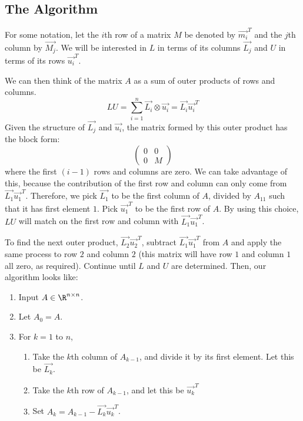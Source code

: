 \documentclass[../Main.tex]{subfiles}
\begin{document}
\subsection{The Algorithm}
For some notation, let the $i$th row of a matrix $M$ be denoted by $\vec{m_i}^T$ and the $j$th column by $\vec{M_j}$. We will be interested in $L$ in terms of its columns $\vec{L_j}$ and $U$ in terms of its rows $\vec{u_i}^T$.

We can then think of the matrix $A$ as a sum of outer products of rows and columns.
\begin{equation*}
    LU = \sum_{i=1}^{n} \vec{L_i} \otimes \vec{u_i} = \vec{L_i} \vec{u_i}^T
\end{equation*}
Given the structure of $\vec{L_j}$ and $\vec{u_i}$, the matrix formed by this outer product has the block form:
\begin{equation*}
    \begin{pmatrix}
        0 & 0 \\
        0 & M
    \end{pmatrix}
\end{equation*}
where the first $(i-1)$ rows and columns are zero. We can take advantage of this, because the contribution of the first row and column can only come from $\vec{L_1} \vec{u_1}^T$. Therefore, we pick $\vec{L_1}$ to be the first column of $A$, divided by $A_{11}$ such that it has first element $1$. Pick $\vec{u_1}^T$ to be the first row of $A$. By using this choice, $LU$ will match on the first row and column with $\vec{L_1} \vec{u_1}^T$.

To find the next outer product, $\vec{L_2} \vec{u_2}^T$, subtract $\vec{L_1} \vec{u_1}^T$ from $A$ and apply the same process to row $2$ and column $2$ (this matrix will have row $1$ and column $1$ all zero, as required). Continue until $L$ and $U$ are determined. Then, our algorithm looks like:
\begin{enumerate}
    \item Input $A \in \R^{n \times n}$.
    \item Let $A_0 = A$.
    \item For $k = 1$ to $n$,
    \begin{enumerate}
        \item Take the $k$th column of $A_{k-1}$, and divide it by its first element. Let this be $\vec{L_k}$.
        \item Take the $k$th row of $A_{k-1}$, and let this be $\vec{u_k}^T$
        \item Set $A_k = A_{k-1} - \vec{L_k} \vec{u_k}^T$.
    \end{enumerate}
\end{enumerate}
\end{document}
